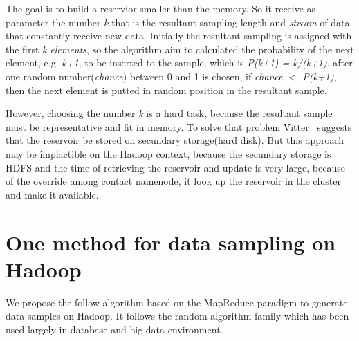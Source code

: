 The goal is to build a reservior smaller than the memory. So
it receive as parameter the number {\it k} that is the resultant sampling length
and {\it stream} of data that constantly receive new data. Initially the resultant
sampling is assigned with the first {\it k elements}, so the algorithm
aim to calculated the probability of the next element, e.g. {\it k+1}, to be inserted
to the sample, which is {\it P(k+1) = k/(k+1)}, after one random number({\it chance})
between 0 and 1 is chosen, if {\it chance $<$ P(k+1)}, then the next element is putted
in random position in the resultant sample.

However, choosing the number {\it k} is a hard task, because the resultant sample must
be representative and fit in memory. To solve that problem Vitter~\cite{vitter:1985}
suggests that the reservoir be stored on secundary storage(hard disk). But this
approach may be implactible on the Hadoop context, because the secundary storage
is HDFS and the time of retrieving the reservoir and update is very large, because
of the override among contact namenode, it look up the reservoir in the cluster
and make it available.

\section{One method for data sampling on Hadoop}

We propose the follow algorithm based on the MapReduce paradigm to generate data
samples on Hadoop. It follows the random algorithm family which has been used largely
in database and big data environment.

